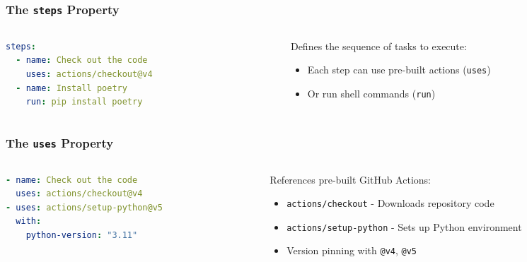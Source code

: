 \begin{frame}[fragile]
	\frametitle{The \texttt{steps} Property}
	\begin{columns}
		\begin{column}{0.5\textwidth}
			\begin{lstlisting}[language=yaml,basicstyle=\small\ttfamily]
steps:
  - name: Check out the code
    uses: actions/checkout@v4
  - name: Install poetry
    run: pip install poetry
			\end{lstlisting}
		\end{column}
		\begin{column}{0.5\textwidth}
			Defines the sequence of tasks to execute:
			\begin{itemize}
				\item Each step can use pre-built actions (\texttt{uses})
				\item Or run shell commands (\texttt{run})
			\end{itemize}
		\end{column}
	\end{columns}
\end{frame}

\begin{frame}[fragile]
	\frametitle{The \texttt{uses} Property}
	\begin{columns}
		\begin{column}{0.5\textwidth}
			\begin{lstlisting}[language=yaml,basicstyle=\small\ttfamily]
- name: Check out the code
  uses: actions/checkout@v4
- uses: actions/setup-python@v5
  with:
    python-version: "3.11"
			\end{lstlisting}
		\end{column}
		\begin{column}{0.5\textwidth}
			References pre-built GitHub Actions:
			\begin{itemize}
				\item \texttt{actions/checkout} - Downloads repository code
				\item \texttt{actions/setup-python} - Sets up Python environment
				\item Version pinning with \texttt{@v4}, \texttt{@v5}
			\end{itemize}
		\end{column}
	\end{columns}
\end{frame}

